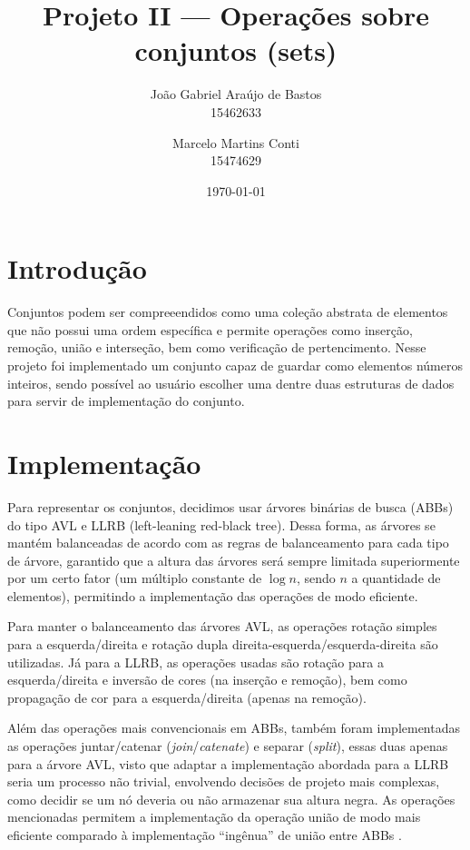 \documentclass[a4paper,12pt]{report}
\title{Projeto \RN{2} --- Operações sobre conjuntos (sets)}
\date{\today}
\author{
	João Gabriel Araújo de Bastos \\ 15462633
	\and
	Marcelo Martins Conti \\ 15474629
}
\begin{document}
\maketitle

\section*{Introdução}

Conjuntos podem ser compreeendidos como uma coleção abstrata de elementos
que não possui uma ordem específica e permite operações como inserção,
remoção, união e interseção, bem como verificação de pertencimento. Nesse
projeto foi implementado um conjunto capaz de guardar como elementos números
inteiros, sendo possível ao usuário escolher uma dentre duas estruturas de 
dados para servir de implementação do conjunto. 

\section*{Implementação}

Para representar os conjuntos, decidimos usar árvores binárias de busca (ABBs)
do tipo AVL e LLRB (left-leaning red-black tree). Dessa forma, as árvores se
mantém balanceadas de acordo com as regras de balanceamento para cada tipo de
árvore, garantido que a altura das árvores será sempre limitada superiormente
por um certo fator (um múltiplo constante de $\log n$, sendo $n$ a quantidade de 
elementos), permitindo a implementação das operações de modo eficiente.

Para manter o balanceamento das árvores AVL, as operações rotação simples 
para a esquerda/direita e rotação dupla direita-esquerda/esquerda-direita
são utilizadas. Já para a LLRB, as operações usadas são rotação para a 
esquerda/direita e inversão de cores (na inserção e remoção), bem como 
propagação de cor para a esquerda/direita (apenas na remoção).

Além das operações mais convencionais em ABBs, também foram implementadas
as operações juntar/catenar (\textit{join}/\textit{catenate}) e separar 
(\textit{split}), essas duas apenas para a árvore AVL, visto que adaptar 
a implementação abordada para a LLRB seria um processo não trivial, 
envolvendo decisões de projeto mais complexas, como decidir se um nó deveria 
ou não armazenar sua altura negra. As operações mencionadas permitem a 
implementação da operação união de modo mais eficiente comparado à implementação 
``ingênua'' de união entre ABBs \parencite{bfs16}.
\end{document}
